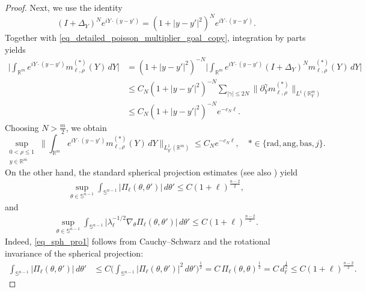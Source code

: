 \documentclass[12pt]{amsart}
\begin{document}
\begin{proof}
Next, we use the identity
\begin{equation*}
    (I+\Delta_Y)^N e^{i Y \cdot (y-y')} = (1 + |y-y'|^2)^N e^{iY\cdot(y-y')}.
\end{equation*}
Together with \eqref{eq_detailed_poisson_multiplier_goal_copy}, integration by parts yields
\begin{align*}
    \biggl| \int_{\mathbb{R}^m} e^{iY\cdot(y-y')} m_{\ell,\rho}^{(*)}(Y) \, dY \biggr|
    &= (1+|y-y'|^2)^{-N} \biggl| \int_{\mathbb{R}^m} e^{iY\cdot(y-y')} (I+\Delta_Y)^N m_{\ell,\rho}^{(*)}(Y) \, dY \biggr|\\[4pt]
    &\le C_N (1+|y-y'|^2)^{-N} \sum_{|\gamma|\le 2N} \bigl\|
        \partial_Y^\gamma m_{\ell,\rho}^{(*)}
    \bigr\|_{L^1(\mathbb R^m_Y)}\\[4pt]
    &\le C_N (1+|y-y'|^2)^{-N} e^{-c_N\ell}.
\end{align*}
Choosing $N>\frac{m}{2}$, we obtain
\begin{equation}\label{eq_multiplier_final}
    \sup_{ \substack{0<\rho\le 1\\ y\in \mathbb{R}^{m}} } \biggl\| \int_{\mathbb{R}^m} e^{iY\cdot(y-y')} m_{\ell,\rho}^{(*)}(Y) \, dY \biggr\|_{L^1_{y'}(\mathbb{R}^m)} \le C_N e^{-c_N \ell}, \quad
    *\in \{ \mathrm{rad}, \mathrm{ang}, \mathrm{bas}, j\}.
\end{equation}
On the other hand, the standard spherical projection estimates \cite[Chapter~IV]{SW2} (see also \cite[Theorem~2.9, Section~2.3]{AHan}) yield
\begin{align}\label{eq_sph_pro1}
    \sup_{\theta \in \mathbb{S}^{n-1}} \int_{\mathbb{S}^{n-1}} |\Pi_{\ell}(\theta, \theta')| \, d\theta' \le C (1+\ell)^{\frac{n-2}{2}},
\end{align}
and
\begin{align}\label{eq_sph_pro2}
    \sup_{\theta \in \mathbb{S}^{n-1}} \int_{\mathbb{S}^{n-1}} \bigl| \lambda_\ell^{-1/2} \nabla_{\theta} \Pi_\ell(\theta, \theta') \bigr| \, d\theta' \le  C (1+\ell)^{\frac{n-2}{2}}.
\end{align}
Indeed, \eqref{eq_sph_pro1} follows from Cauchy--Schwarz and the rotational invariance of the spherical projection:
\begin{align*}
    \int_{\mathbb{S}^{n-1}} |\Pi_{\ell}(\theta, \theta')| \, d\theta'
    &\le C \biggl( \int_{\mathbb{S}^{n-1}} |\Pi_\ell(\theta,\theta')|^2 \, d\theta' \biggr)^{\frac{1}{2}}
    = C \, \Pi_\ell(\theta, \theta)^{\frac{1}{2}}
    = C \, d_\ell^{\frac{1}{2}}
    \le C (1+\ell)^{\frac{n-2}{2}}.
\end{align*}

\end{proof}
\end{document}
